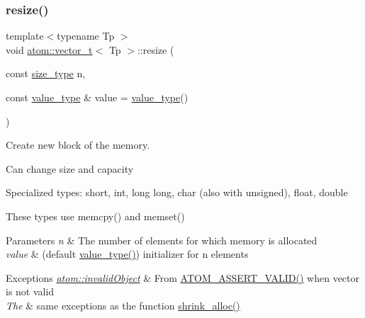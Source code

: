 \subsubsection{\texorpdfstring{resize()}{resize()}}
{\footnotesize\ttfamily template$<$typename Tp $>$ \\
void \hyperlink{classatom_1_1vector__t}{atom\+::vector\+\_\+t}$<$ Tp $>$\+::resize (\begin{DoxyParamCaption}\item[{const \hyperlink{classatom_1_1vector__t_a1790d79321f4fa8d2580474dd0f56033}{size\+\_\+type}}]{n,  }\item[{const \hyperlink{classatom_1_1vector__t_a558283a4fed53856d445ceb61ac96d94}{value\+\_\+type} \&}]{value = {\ttfamily \hyperlink{classatom_1_1vector__t_a558283a4fed53856d445ceb61ac96d94}{value\+\_\+type}()} }\end{DoxyParamCaption})}



Create new block of the memory. 

Can change size and capacity

Specialized types\+: short, int, long long, char (also with unsigned), float, double

These types use memcpy() and memset() 
\begin{DoxyParams}{Parameters}
{\em n} & The number of elements for which memory is allocated \\
\hline
{\em value} & (default \hyperlink{classatom_1_1vector__t_a558283a4fed53856d445ceb61ac96d94}{value\+\_\+type()}) initializer for n elements \\
\hline
\end{DoxyParams}

\begin{DoxyExceptions}{Exceptions}
{\em \hyperlink{classatom_1_1invalid_object}{atom\+::invalid\+Object}} & From \hyperlink{debug__tools_8h_a273b49426c51bc6a7eb989ee0acbdc6b}{A\+T\+O\+M\+\_\+\+A\+S\+S\+E\+R\+T\+\_\+\+V\+A\+L\+I\+D()} when vector is not valid \\
\hline
{\em The} & same exceptions as the function \hyperlink{classatom_1_1vector__t_afdf1ffed030302fa380605478984b854}{shrink\+\_\+alloc()} \\
\hline
\end{DoxyExceptions}
\mbox{\label{classatom_1_1vector__t_afdf1ffed030302fa380605478984b854}} 
